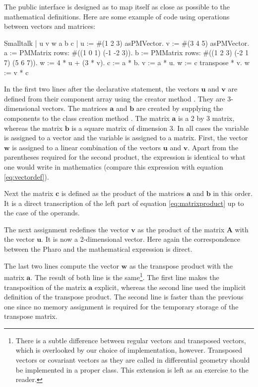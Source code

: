 The public interface is designed as to map itself as close as
possible to the mathematical definitions. Here are some example of
code using operations between vectors and matrices:
\begin{displaycode}{Smalltalk}
| u v w a b c |
u := #(1 2 3) asPMVector.
v := #(3 4 5) asPMVector.
a := PMMatrix rows: #((1 0 1) (-1 -2 3)).
b := PMMatrix rows: #((1 2 3) (-2 1 7) (5 6 7)).
w := 4 * u + (3 * v).
c := a * b.
v := a * u.
w := c transpose * v.
w := v * c
\end{displaycode}
In the first two lines after the declarative statement, the
vectors ${\textbf{u}}$ and ${\textbf{v}}$ are defined from their component
array using the creator method .
They are 3-dimensional vectors. The matrices ${\textbf{a}}$ and ${\textbf{b}}$ are
created by supplying the components to the class creation method . The matrix $\textbf{a}$ is a 2 by 3 matrix, whereas the
matrix $\textbf{b}$ is a square matrix of dimension 3. In all cases
the variable  is assigned to a vector and the variable  is assigned to a matrix. First, the vector $\textbf{w}$ is
assigned to a linear combination of the vectors $\textbf{u}$ and
$\textbf{v}$. Apart from the parentheses required for the second
product, the expression is identical to what one would write in
mathematics (compare this expression with equation
\ref{eq:vectordef}).

Next the matrix $\textbf{c}$ is defined as the product of the
matrices $\textbf{a}$ and $\textbf{b}$ in this order. It is a direct
transcription of the left part of equation \ref{eq:matrixproduct}
up to the case of the operands.

The next assignment redefines the vector $\textbf{v}$ as the product
of the matrix $\textbf{A}$ with the vector $\textbf{u}$. It is now a
2-dimensional vector. Here again the correspondence between the
Pharo and the mathematical expression is direct.

The last two lines compute the vector $\textbf{w}$ as the transpose
product with the matrix $\textbf{a}$. The result of both line is the
same\footnote{\label{ft:covariant}There is a subtle difference
between regular vectors and transposed vectors, which is
overlooked by our choice of implementation, however. Transposed
vectors or covariant vectors as they are called in differential
geometry should be implemented in a proper class. This extension
is left as an exercise to the reader.}. The first line makes the
transposition of the matrix $\textbf{a}$ explicit, whereas the second
line used the implicit definition of the transpose product. The
second line is faster than the previous one since no memory
assignment is required for the temporary storage of the transpose
matrix.

